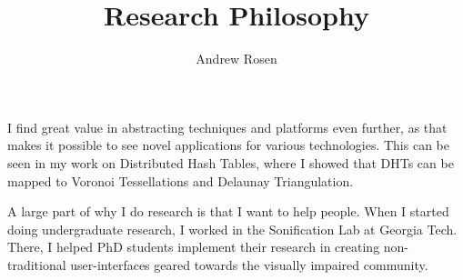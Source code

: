 \documentclass[10pt, a4paper]{article}
\author{Andrew Rosen}
\title{Research Philosophy}
\date{}
\begin{document}
\maketitle




I find great value in abstracting techniques and platforms even further, as that makes it possible to see novel applications for various technologies.  
This can be seen in my work on Distributed Hash Tables, where I showed that DHTs can be mapped to Voronoi Tessellations and Delaunay Triangulation.


A large part of why I do research is that I want to help people.
When I started doing undergraduate research, I worked in the Sonification Lab at Georgia Tech.
There, I helped PhD students implement their research in creating  non-traditional user-interfaces geared towards the visually impaired community.
\end{document}
